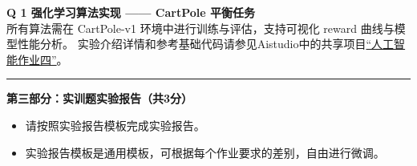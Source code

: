 \documentclass[a4paper, 11pt]{article}
\newenvironment{problem}[2][Q]
    { \begin{mdframed}[backgroundcolor=gray!20] \textbf{#1 #2} \\}
    {  \end{mdframed}}
\begin{document}
\begin{CJK}{UTF8}{gbsn}
\begin{problem}{1 强化学习算法实现 —— CartPole 平衡任务}
所有算法需在 CartPole-v1 环境中进行训练与评估，支持可视化 reward 曲线与模型性能分析。
实验介绍详情和参考基础代码请参见Aistudio中的共享项目\href{https://aistudio.baidu.com/studio/project/partial/verify/9223866/1b1108869dd945869c2b33cb1ef240ff}{“人工智能作业四”}。
\end{problem}

\noindent\rule{7in}{1pt}
\textbf{第三部分：实训题实验报告（共3分）}
\begin{itemize}
    \item 请按照实验报告模板完成实验报告。
    \item 实验报告模板是通用模板，可根据每个作业要求的差别，自由进行微调。
\end{itemize}

\end{CJK}
\end{document}
